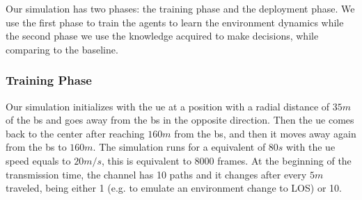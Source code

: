 Our simulation has two phases: the training phase and the deployment phase. We use the first phase to train the agents to learn the environment dynamics while the second phase we use the knowledge acquired to make decisions, while comparing to the baseline.

\subsubsection{Training Phase}
%

Our simulation initializes with the \gls{ue} at a position with a radial distance of $35m$ of the \gls{bs} and goes away from the \gls{bs} in the opposite direction.
%
Then the \gls{ue} comes back to the center after reaching $160m$ from the \gls{bs}, and then it moves away again from the \gls{bs} to $160m$.
%
The simulation runs for a equivalent of $80s$ with the \gls{ue} speed equals to $20m/s$, this is equivalent to 8000 frames.
%
At the beginning of the transmission time, the channel has 10 paths and it changes after every $5m$ traveled, being either 1 (e.g. to emulate an environment change to LOS) or 10.

